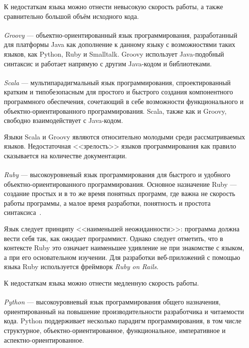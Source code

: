 К недостаткам языка можно отнести невысокую скорость работы, а также
сравнительно большой объём исходного кода.

\paragraph{}
\textit{Groovy} --- объектно-ориентированный язык программирования, разработанный для
платформы Java как дополнение к данному языку с возможностями таких языков, как Python,
Ruby и Smalltalk. Groovy использует Java-подобный синтаксис и работает напрямую с другим
Java-кодом и библиотеками.

\paragraph{}
\textit{Scala} --- мультипарадигмальный язык программирования, спроектированный кратким
и типобезопасным для простого и быстрого создания компонентного программного обеспечения,
сочетающий в себе возможности функционального и объектно-ориентированного программирования.
Scala, также как и Groovy, свободно взаимодействует с Java-кодом.

Языки Scala и Groovy являются относительно молодыми среди рассматриваемых языков.
Недостаточная <<зрелость>> языков программирования как правило сказывается на количестве
документации.

\paragraph{}
\textit{Ruby} --- высокоуровневый язык программирования для быстрого и удобного
объектно-ориентированного программирования. Основное назначение Ruby --- создание
простых и в то же время понятных программ, где важна не скорость работы программы,
а малое время разработки, понятность и простота синтаксиса~\cite{ruby_habr}.

Язык следует принципу <<наименьшей неожиданности>>: программа должна вести себя так,
как ожидает программист. Однако следует отметить, что в контексте Ruby
это означает наименьшее удивление не при знакомстве с языком, а при его основательном изучении.
Для разработки веб-приложений с помощью языка Ruby используется
фреймворк \textit{Ruby on Rails}.

К недостаткам языка можно отнести медленную скорость работы.

\paragraph{}
\textit{Python} --- высокоуровневый язык программирования общего назначения, ориентированный
на повышение производительности разработчика и читаемости кода. Python поддерживает
несколько парадигм программирования, в том числе структурное, объектно-ориентированное,
функциональное, императивное и аспектно-ориентированное.

